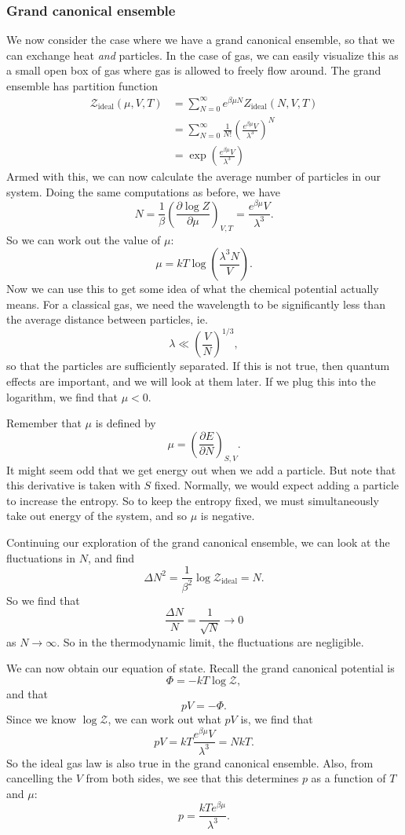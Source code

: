 \documentclass[a4paper]{article}
\begin{document}
\subsubsection*{Grand canonical ensemble}
We now consider the case where we have a grand canonical ensemble, so that we can exchange heat \emph{and} particles. In the case of gas, we can easily visualize this as a small open box of gas where gas is allowed to freely flow around. The grand ensemble has partition function
\begin{align*}
  \mathcal{Z}_{\mathrm{ideal}}(\mu, V, T) &= \sum_{N = 0}^\infty e^{\beta \mu N} Z_{\mathrm{ideal}}(N, V, T) \\
  &= \sum_{N = 0}^\infty \frac{1}{N!} \left(\frac{e^{\beta \mu} V}{\lambda^3}\right)^N\\
  &= \exp\left(\frac{e^{\beta \mu}V}{\lambda^3}\right)
\end{align*}
Armed with this, we can now calculate the average number of particles in our system. Doing the same computations as before, we have
\[
  N = \frac{1}{\beta} \left(\frac{\partial \log Z}{\partial \mu}\right)_{V, T} = \frac{e^{\beta \mu}V}{\lambda^3}.
\]
So we can work out the value of $\mu$:
\[
  \mu = kT \log \left(\frac{\lambda^3 N}{V}\right).
\]
Now we can use this to get some idea of what the chemical potential actually means. For a classical gas, we need the wavelength to be significantly less than the average distance between particles, ie.
\[
  \lambda \ll \left(\frac{V}{N}\right)^{1/3},
\]
so that the particles are sufficiently separated. If this is not true, then quantum effects are important, and we will look at them later. If we plug this into the logarithm, we find that $\mu < 0$.

Remember that $\mu$ is defined by
\[
  \mu = \left(\frac{\partial E}{\partial N}\right)_{S, V}.
\]
It might seem odd that we get energy out when we add a particle. But note that this derivative is taken with $S$ fixed. Normally, we would expect adding a particle to increase the entropy. So to keep the entropy fixed, we must simultaneously take out energy of the system, and so $\mu$ is negative.

Continuing our exploration of the grand canonical ensemble, we can look at the fluctuations in $N$, and find
\[
  \Delta N^2 = \frac{1}{\beta^2} \log \mathcal{Z}_{\mathrm{ideal}} = N.
\]
So we find that
\[
  \frac{\Delta N}{N} = \frac{1}{\sqrt{N}} \to 0
\]
as $N \to \infty$. So in the thermodynamic limit, the fluctuations are negligible.

We can now obtain our equation of state. Recall the grand canonical potential is
\[
  \Phi = -kT \log \mathcal{Z},
\]
and that
\[
  pV = -\Phi.
\]
Since we know $\log \mathcal{Z}$, we can work out what $pV$ is, we find that
\[
  pV = kT \frac{e^{\beta \mu}V}{\lambda^3} = NkT.
\]
So the ideal gas law is also true in the grand canonical ensemble. Also, from cancelling the $V$ from both sides, we see that this determines $p$ as a function of $T$ and $\mu$:
\[
  p = \frac{kT e^{\beta\mu}}{\lambda^3}.
\]
\end{document}

